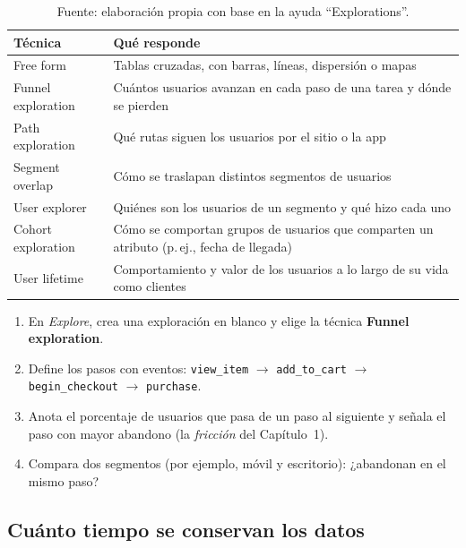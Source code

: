 \documentclass[11pt,letterpaper]{article}
\begin{document}
\begin{table}[h]
\centering
\begin{tabular}{@{}p{3.6cm}p{10.9cm}@{}}
\toprule
\textbf{Técnica} & \textbf{Qué responde} \\
\midrule
Free form & Tablas cruzadas, con barras, líneas, dispersión o mapas \\
Funnel exploration & Cuántos usuarios avanzan en cada paso de una tarea y dónde se pierden \\
Path exploration & Qué rutas siguen los usuarios por el sitio o la app \\
Segment overlap & Cómo se traslapan distintos segmentos de usuarios \\
User explorer & Quiénes son los usuarios de un segmento y qué hizo cada uno \\
Cohort exploration & Cómo se comportan grupos de usuarios que comparten un atributo (p.\,ej., fecha de llegada) \\
User lifetime & Comportamiento y valor de los usuarios a lo largo de su vida como clientes \\
\bottomrule
\end{tabular}
\caption*{Fuente: elaboración propia con base en la ayuda \enquote{Explorations}.}
\end{table}

\begin{cajaPasos}[title={Práctica: un embudo de compra}]
\begin{enumerate}[nosep,label=\arabic*.]
  \item En \emph{Explore}, crea una exploración en blanco y elige la técnica \textbf{Funnel exploration}.
  \item Define los pasos con eventos: \texttt{view\_item} $\rightarrow$ \texttt{add\_to\_cart} $\rightarrow$ \texttt{begin\_checkout} $\rightarrow$ \texttt{purchase}.
  \item Anota el porcentaje de usuarios que pasa de un paso al siguiente y señala el paso con mayor abandono (la \emph{fricción} del Capítulo~1).
  \item Compara dos segmentos (por ejemplo, móvil y escritorio): ¿abandonan en el mismo paso?
\end{enumerate}
\end{cajaPasos}

\subsection{Cuánto tiempo se conservan los datos}
\end{document}
